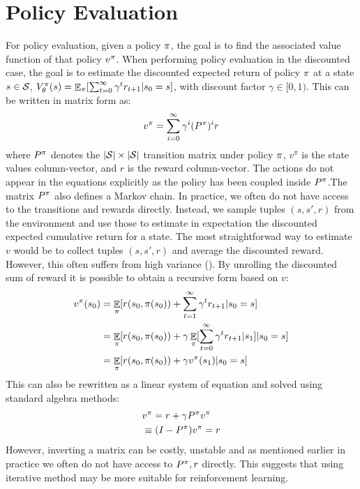 \section{Policy Evaluation}
For policy evaluation,  given a policy $\pi$, the goal is to find the associated value function of that policy $v^{\pi}$. 
When performing policy evaluation in the discounted case, the goal is to estimate the discounted expected return of policy $\pi$ at a state $s\in\mathcal{S}$,  $V_{\theta}^{\pi}(s) = \mathop{\mathbb{E}}_{\pi}[\sum_{t=0}^{\infty} \gamma^t r_{t+1} | s_0 = s]$, with discount factor $\gamma \in [0,1)$. This can be written in matrix form as:
\begin{equation}
     v^{\pi} = \sum_{i=0}^{\infty} \gamma^i (P^{\pi})^i r
\end{equation}
where $P^{\pi}$ denotes the $|\mathcal{S}|\times |\mathcal{S}|$ transition matrix under policy $\pi$, $v^\pi$ is the state values column-vector, and $r$ is the reward column-vector. The actions do not appear in the equations explicitly as the policy has been coupled inside $P^{\pi}$.The matrix $P^{\pi}$ also defines a Markov chain.
In practice, we often do not have  access to the transitions and rewards directly. Instead, we sample tuples $(s,s',r)$ from the environment and use those to estimate in expectation the discounted expected cumulative return for a state.
The most straightforwad way to estimate $v$ would be to collect tuples $(s,s',r)$  and average the discounted reward. However, this often suffers from high variance (\cite{kearns2000bias}). By unrolling the discounted sum of reward it is possible to obtain a recursive form based on $v$:
\begin{equation}
\label{equ:bellman}
\begin{split}
    v^{\pi}(s_0) &=  \mathop{\mathbb{E}}_{\pi}[r (s_0,\pi(s_0)) + \sum_{t=1}^{\infty} \gamma^t r_{t+1} | s_0 = s] \\
    &=  \mathop{\mathbb{E}}_{\pi}[r (s_0,\pi(s_0)) + \gamma \mathop{\mathbb{E}}_{\pi}[\sum_{t=0}^{\infty} \gamma^t r_{t+1}|s_1] | s_0 = s]\\
    &= \mathop{\mathbb{E}}_{\pi}[r (s_0,\pi(s_0)) + \gamma v^{\pi}(s_1) | s_0 = s] \\
\end{split}
\end{equation}
This can also be rewritten as a linear system of equation and solved using standard algebra methods:
\begin{equation}
\label{eq:fixed_point}
\begin{split}
    & v^{\pi} = r + \gamma P^{\pi}v^{\pi} \\
    &\equiv (I-P^{\pi})v^{\pi} = r
\end{split}
\end{equation}
However, inverting a matrix can be costly, unstable and as mentioned earlier in practice we often do not have access to $P^{\pi},r$ directly. This suggests that using iterative method may be more suitable for reinforcement learning.
